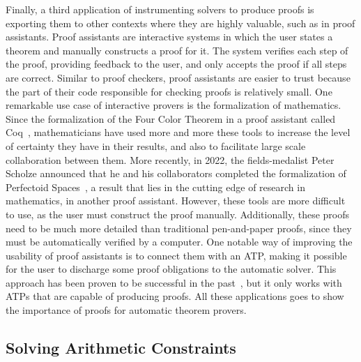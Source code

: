 \documentclass[a4paper, 12pt]{article}
\begin{document}
Finally, a third application of instrumenting solvers to produce proofs is exporting them to
other contexts where they are highly valuable, such as in proof assistants.
%
Proof assistants are interactive systems in which the user states a theorem and manually constructs
a proof for it. The system verifies each step of the proof, providing feedback to the user, and only
accepts the proof if all steps are correct.
%
Similar to proof checkers, proof assistants are easier to trust because the part of their code
responsible for checking proofs is relatively small.
%
One remarkable use case of interactive provers is the formalization of mathematics.
Since the formalization of the Four Color Theorem in a proof assistant called Coq~\cite{fctCoq},
mathematicians have used more and more these tools to increase the level of certainty
they have in their results, and also to facilitate large scale collaboration between them.
More recently, in 2022, the fields-medalist Peter Scholze announced that he and his collaborators
completed the formalization of Perfectoid Spaces~\cite{scholze}, a result that lies in the
cutting edge of research in mathematics, in another proof assistant.
%
However, these tools are more difficult to use, as the user must construct the proof
manually. Additionally, these proofs need to be much more detailed than traditional pen-and-paper proofs,
since they must be automatically verified by a computer.
%
One notable way of improving the usability of proof assistants is to connect them with an ATP,
making it possible for the user to discharge some proof obligations to the automatic solver.
This approach has been proven to be successful in the past~\cite{coq2, reconstruct}, but it
only works with ATPs that are capable of producing proofs.
%
All these applications goes to show the importance of proofs for automatic theorem provers.


\subsection{Solving Arithmetic Constraints}
\end{document}
